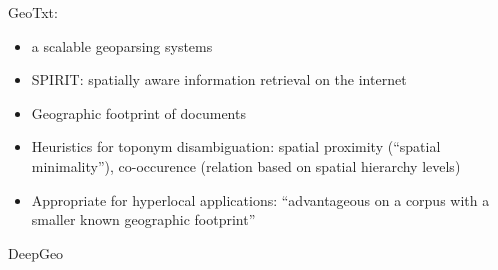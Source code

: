 GeoTxt:
\begin{itemize}
	\item {\color{orange}a scalable geoparsing systems\cite{Karimzadeh2019a}}
	\item {\color{orange}SPIRIT: spatially aware information retrieval on the internet\cite{Karimzadeh2019a}}
	\item {\color{orange} Geographic footprint of documents\cite{Karimzadeh2019a}}
	\item {\color{orange}Heuristics for toponym disambiguation: spatial proximity (“spatial minimality”), co-occurence (relation based on spatial hierarchy levels)\cite{Karimzadeh2019a}}
	\item {\color{orange}Appropriate for hyperlocal applications: “advantageous on a corpus with a smaller known geographic footprint”\cite{Karimzadeh2019a}}
\end{itemize}

{DeepGeo \cite{Snyder2019}}\\

